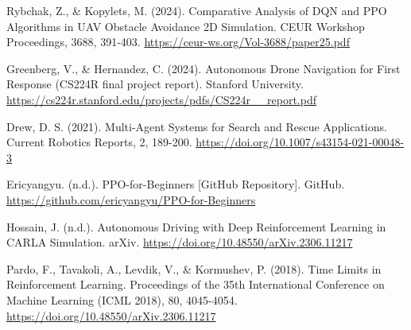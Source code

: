 \documentclass[12pt,a4paper]{article}
\begin{document}
\begin{thebibliography}{9}
Rybchak, Z., \& Kopylets, M. (2024). 
Comparative Analysis of DQN and PPO Algorithms in UAV Obstacle Avoidance 2D Simulation. 
CEUR Workshop Proceedings, 3688, 391-403. 
\url{https://ceur-ws.org/Vol-3688/paper25.pdf}

Greenberg, V., \& Hernandez, C. (2024). 
Autonomous Drone Navigation for First Response (CS224R final project report). 
Stanford University. 
\url{https://cs224r.stanford.edu/projects/pdfs/CS224r__report.pdf}

Drew, D. S. (2021). 
Multi-Agent Systems for Search and Rescue Applications. 
Current Robotics Reports, 2, 189-200. 
\url{https://doi.org/10.1007/s43154-021-00048-3}

Ericyangyu. (n.d.). 
PPO-for-Beginners [GitHub Repository]. 
GitHub. 
\url{https://github.com/ericyangyu/PPO-for-Beginners}

Hossain, J. (n.d.). 
Autonomous Driving with Deep Reinforcement Learning in CARLA Simulation. 
arXiv. 
\url{https://doi.org/10.48550/arXiv.2306.11217}

Pardo, F., Tavakoli, A., Levdik, V., \& Kormushev, P. (2018). 
Time Limits in Reinforcement Learning. 
Proceedings of the 35th International Conference on Machine Learning (ICML 2018), 80, 4045-4054. 
\url{https://doi.org/10.48550/arXiv.2306.11217}

\end{thebibliography}
\end{document}
